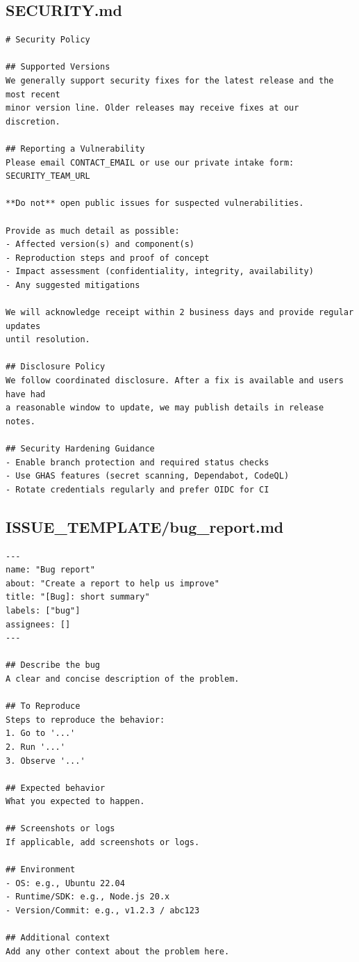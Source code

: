 \documentclass[11pt,letterpaper]{article}
\begin{document}
\subsection{SECURITY.md}
\begin{verbatim}
# Security Policy

## Supported Versions
We generally support security fixes for the latest release and the most recent
minor version line. Older releases may receive fixes at our discretion.

## Reporting a Vulnerability
Please email CONTACT_EMAIL or use our private intake form:
SECURITY_TEAM_URL

**Do not** open public issues for suspected vulnerabilities.

Provide as much detail as possible:
- Affected version(s) and component(s)
- Reproduction steps and proof of concept
- Impact assessment (confidentiality, integrity, availability)
- Any suggested mitigations

We will acknowledge receipt within 2 business days and provide regular updates
until resolution.

## Disclosure Policy
We follow coordinated disclosure. After a fix is available and users have had
a reasonable window to update, we may publish details in release notes.

## Security Hardening Guidance
- Enable branch protection and required status checks
- Use GHAS features (secret scanning, Dependabot, CodeQL)
- Rotate credentials regularly and prefer OIDC for CI
\end{verbatim}
\clearpage

\subsection{ISSUE\_TEMPLATE/bug\_report.md}
\begin{verbatim}
---
name: "Bug report"
about: "Create a report to help us improve"
title: "[Bug]: short summary"
labels: ["bug"]
assignees: []
---

## Describe the bug
A clear and concise description of the problem.

## To Reproduce
Steps to reproduce the behavior:
1. Go to '...'
2. Run '...'
3. Observe '...'

## Expected behavior
What you expected to happen.

## Screenshots or logs
If applicable, add screenshots or logs.

## Environment
- OS: e.g., Ubuntu 22.04
- Runtime/SDK: e.g., Node.js 20.x
- Version/Commit: e.g., v1.2.3 / abc123

## Additional context
Add any other context about the problem here.
\end{verbatim}
\clearpage
\end{document}
